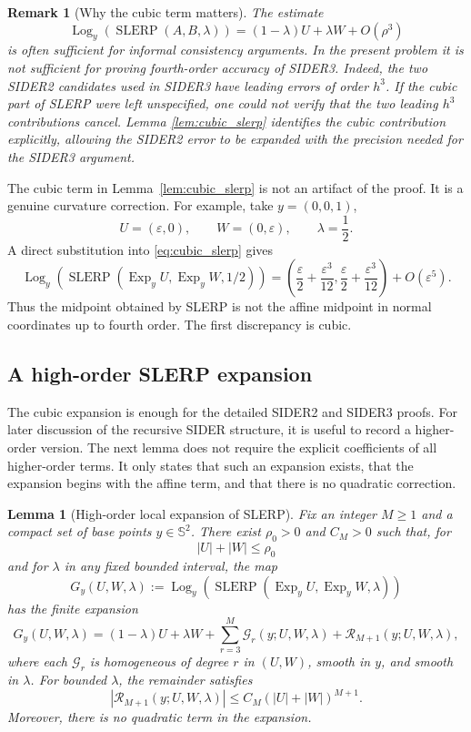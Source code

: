 \documentclass[a4paper,11pt]{article}
\newcommand{\bS}{\mathbb{S}}
\newcommand{\Log}{\operatorname{Log}}
\newcommand{\Exp}{\operatorname{Exp}}
\newcommand{\SLERP}{\operatorname{SLERP}}
\newtheorem{lemma}{Lemma}
\newtheorem{remark}{Remark}
\numberwithin{equation}{section}
\begin{document}
\begin{remark}[Why the cubic term matters]
The estimate
\[
\Log_y(\SLERP(A,B,\lambda))
=
(1-\lambda)U+\lambda W+O(\rho^3)
\]
is often sufficient for informal consistency arguments.  In the present
problem it is not sufficient for proving fourth-order accuracy of SIDER3.
Indeed, the two SIDER2 candidates used in SIDER3 have leading errors of order
\(h^3\).  If the cubic part of SLERP were left unspecified, one could not
verify that the two leading \(h^3\) contributions cancel.  Lemma
\ref{lem:cubic_slerp} identifies the cubic contribution explicitly, allowing
the SIDER2 error to be expanded with the precision needed for the SIDER3
argument.
\end{remark}

The cubic term in Lemma~\ref{lem:cubic_slerp} is not an artifact of the proof.
It is a genuine curvature correction.  For example, take
\(y=(0,0,1)\),
\[
        U=(\varepsilon,0),\qquad W=(0,\varepsilon),
        \qquad \lambda=\frac12 .
\]
A direct substitution into \eqref{eq:cubic_slerp} gives
\[
\Log_y\!\left(
        \SLERP(\Exp_y U,\Exp_y W,1/2)
        \right)
=
\left(
        \frac{\varepsilon}{2}+\frac{\varepsilon^3}{12},
        \frac{\varepsilon}{2}+\frac{\varepsilon^3}{12}
\right)
+O(\varepsilon^5).
\]
Thus the midpoint obtained by SLERP is not the affine midpoint in normal
coordinates up to fourth order.  The first discrepancy is cubic.

\subsection{A high-order SLERP expansion}

The cubic expansion is enough for the detailed SIDER2 and SIDER3 proofs.
For later discussion of the recursive SIDER structure, it is useful to record
a higher-order version.  The next lemma does not require the explicit
coefficients of all higher-order terms.  It only states that such an expansion
exists, that the expansion begins with the affine term, and that there is no
quadratic correction.

\begin{lemma}[High-order local expansion of SLERP]
\label{lem:high_order_slerp}
Fix an integer \(M\geq1\) and a compact set of base points \(y\in\bS^2\).
There exist \(\rho_0>0\) and \(C_M>0\) such that, for
\[
        |U|+|W|\leq\rho_0
\]
and for \(\lambda\) in any fixed bounded interval, the map
\[
G_y(U,W,\lambda)
:=
\Log_y\!\left(\SLERP(\Exp_y U,\Exp_y W,\lambda)\right)
\]
has the finite expansion
\begin{equation}
\label{eq:high_order_slerp}
G_y(U,W,\lambda)
=
(1-\lambda)U+\lambda W
+
\sum_{r=3}^{M}\mathcal G_r(y;U,W,\lambda)
+
\mathcal R_{M+1}(y;U,W,\lambda),
\end{equation}
where each \(\mathcal G_r\) is homogeneous of degree \(r\) in \((U,W)\),
smooth in \(y\), and smooth in \(\lambda\).  For bounded \(\lambda\), the
remainder satisfies
\[
        |\mathcal R_{M+1}(y;U,W,\lambda)|
        \leq
        C_M(|U|+|W|)^{M+1}.
\]
Moreover, there is no quadratic term in the expansion.
\end{lemma}
\end{document}
